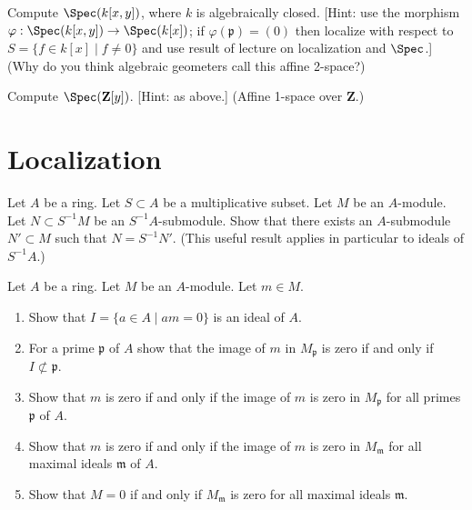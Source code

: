 \begin{exercise}
\label{exercise-primes-kxy}
 Compute $\Spec(k[x, y])$, where $k$ is algebraically
closed.
[Hint: use the morphism
$\varphi : \Spec(k[x, y]) \to \Spec(k[x])$; if
$\varphi({\mathfrak p}) = (0)$ then localize with respect to
$S = \{f\in k[x] \mid f \not = 0\}$ and use result of lecture
on localization and $\Spec$.]
(Why do you think algebraic geometers call this affine 2-space?)
\end{exercise}

\begin{exercise}
\label{exercise-primes-Zy}
Compute $\Spec(\mathbf{Z}[y])$.
[Hint: as above.] (Affine 1-space over $\mathbf{Z}$.)
\end{exercise}






\section{Localization}
\label{section-localization}


\begin{exercise}
\label{exercise-submodule-localization}
Let $A$ be a ring. Let $S \subset A$ be a multiplicative subset.
Let $M$ be an $A$-module. Let $N \subset S^{-1}M$ be an $S^{-1}A$-submodule.
Show that there exists an $A$-submodule $N' \subset M$ such that
$N = S^{-1}N'$. (This useful result applies in particular to ideals
of $S^{-1}A$.)
\end{exercise}

\begin{exercise}
\label{exercise-localize-zero}
Let $A$ be a ring. Let $M$ be an $A$-module. Let $m \in M$.
\begin{enumerate}
\item Show that $I = \{a \in A \mid am = 0\}$ is an ideal of $A$.
\item For a prime $\mathfrak p$ of $A$ show that the image of $m$
in $M_\mathfrak p$ is zero if and only if $I \not \subset \mathfrak p$.
\item Show that $m$ is zero if and only if the image of $m$ is zero
in $M_\mathfrak p$ for all primes $\mathfrak p$ of $A$.
\item Show that $m$ is zero if and only if the image of $m$ is zero
in $M_\mathfrak m$ for all maximal ideals $\mathfrak m$ of $A$.
\item Show that $M = 0$ if and only if $M_{\mathfrak m}$ is zero
for all maximal ideals $\mathfrak m$.
\end{enumerate}
\end{exercise}


